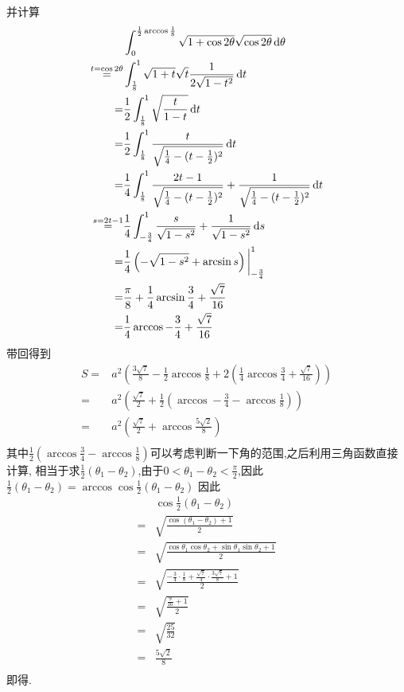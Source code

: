 \begin{solution}
        并计算\begin{align*}
            &\int_{0}^{\frac{1}{2}\arccos\frac{1}{8}}\sqrt{1+\cos2\theta}\sqrt{\cos2\theta}\operatorname{d\!} \theta \\
            \overset{t=\cos 2\theta}{=}&\int_{\frac{1}{8}}^{1}\sqrt{1+t}\sqrt{t}\frac{1}{2\sqrt{1-t^2}}\operatorname{d\!} t\\
            =&\frac{1}{2}\int_{\frac{1}{8}}^{1}\sqrt{\frac{t}{1-t}}\operatorname{d\!} t\\
            =&\frac{1}{2}\int_{\frac{1}{8}}^{1}\frac{t}{\sqrt{\frac{1}{4}-(t-\frac{1}{2})^2}}\operatorname{d\!} t\\
            =&\frac{1}{4}\int_{\frac{1}{8}}^{1}\frac{2t-1}{\sqrt{\frac{1}{4}-(t-\frac{1}{2})^2}}+\frac{1}{\sqrt{\frac{1}{4}-(t-\frac{1}{2})^2}}\operatorname{d\!} t\\
            \overset{s=2t-1}{=}&\frac{1}{4}\int_{-\frac{3}{4}}^{1}\frac{s}{\sqrt{1-s^2}}+\frac{1}{\sqrt{1-s^2}}\operatorname{d\!} s\\
            =&\frac{1}{4}\left(-\sqrt{1-s^2}+\arcsin s\right)\bigg|_{-\frac{3}{4}}^{1}\\
            =&\frac{\pi}{8}+\frac{1}{4}\arcsin\frac{3}{4}+\frac{\sqrt{7}}{16}\\
            =&\frac{1}{4}\arccos-\frac{3}{4}+\frac{\sqrt{7}}{16}\\
        \end{align*}
        带回得到\begin{align*}
            S=&a^2\left(\frac{3\sqrt{7}}{8}-\frac{1}{2}\arccos\frac{1}{8}+2(\frac{1}{4}\arccos\frac{3}{4}+\frac{\sqrt{7}}{16})\right)\\
            =&a^2\left(\frac{\sqrt{7}}{2}+\frac{1}{2}\left(\arccos-\frac{3}{4}-\arccos\frac{1}{8}\right)\right)\\
            =&a^2\left(\frac{\sqrt{7}}{2}+\arccos\frac{5\sqrt{2}}{8}\right)\\
        \end{align*}
        其中$\frac{1}{2}\left(\arccos\frac{3}{4}-\arccos\frac{1}{8}\right)$可以考虑判断一下角的范围,之后利用三角函数直接计算,
        相当于求$\frac{1}{2}(\theta_1-\theta_2)$,由于$0<\theta_1-\theta_2<\frac{\pi}{2}$,因此$\frac{1}{2}(\theta_1-\theta_2)=\arccos\cos\frac{1}{2}(\theta_1-\theta_2)$
        因此\begin{align*}
            &\cos\frac{1}{2}(\theta_1-\theta_2)\\
            =&\sqrt{\frac{\cos(\theta_1-\theta_2)+1}{2}}\\
            =&\sqrt{\frac{\cos\theta_1\cos\theta_2+\sin\theta_1\sin\theta_2+1}{2}}\\
            =&\sqrt{\frac{-\frac{3}{4}\cdot\frac{1}{8}+\frac{\sqrt{7}}{4}\cdot\frac{3\sqrt{7}}{8}+1}{2}}\\
            =&\sqrt{\frac{\frac{9}{16}+1}{2}}\\
            =&\sqrt{\frac{25}{32}}\\
            =&\frac{5\sqrt{2}}{8}\\
        \end{align*}
        即得.
    \end{solution} 


